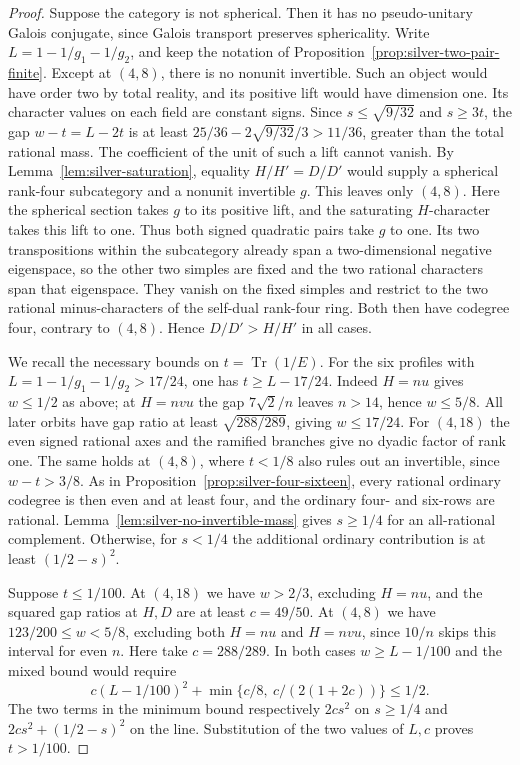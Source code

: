 \documentclass[11pt,reqno]{amsart}
\theoremstyle{remark}\newtheorem{remark}[theorem]{Remark}
\numberwithin{equation}{section}
\begin{document}
\begin{proof}
Suppose the category is not spherical. Then it has no pseudo-unitary
Galois conjugate, since Galois transport preserves sphericality.
Write $L=1-1/g_1-1/g_2$, and keep the notation of
Proposition~\ref{prop:silver-two-pair-finite}. Except at $(4,8)$, there is no nonunit
invertible. Such an object would have order two by total reality,
and its positive lift would have dimension one. Its character values
on each field are constant signs. Since $s\le\sqrt{9/32}$ and
$s\ge3t$, the gap $w-t=L-2t$ is at least
$25/36-2\sqrt{9/32}/3>11/36$, greater than the total rational mass.
The coefficient of the unit of such a lift cannot vanish.
By Lemma~\ref{lem:silver-saturation}, equality $H/H'=D/D'$ would
supply a spherical rank-four subcategory and a nonunit invertible
$g$. This leaves only $(4,8)$. Here the spherical section takes $g$
to its positive lift, and the saturating $H$-character takes this
lift to one. Thus both signed quadratic pairs take $g$ to one.
Its two transpositions within the subcategory already span a
two-dimensional negative eigenspace, so the other two simples
are fixed and the two rational characters span that eigenspace.
They vanish on the fixed simples and restrict to the two rational
minus-characters of the self-dual rank-four ring. Both then have
codegree four, contrary to $(4,8)$. Hence $D/D'>H/H'$ in all cases.

We recall the necessary bounds on $t=\operatorname{Tr}(1/E)$. For
the six profiles with $L=1-1/g_1-1/g_2>17/24$, one has
$t\ge L-17/24$. Indeed $H=nu$ gives $w\le1/2$ as above; at
$H=nvu$ the gap $7\sqrt2/n$ leaves $n>14$, hence $w\le5/8$.
All later orbits have gap ratio at least $\sqrt{288/289}$, giving
$w\le17/24$.
For $(4,18)$ the even signed rational axes and the ramified branches
give no dyadic factor of rank one. The same holds at $(4,8)$, where
$t<1/8$ also rules out an invertible, since $w-t>3/8$. As in
Proposition~\ref{prop:silver-four-sixteen}, every rational ordinary
codegree is then even and at least four, and the ordinary four- and
six-rows are rational. Lemma~\ref{lem:silver-no-invertible-mass}
gives $s\ge1/4$ for an all-rational complement. Otherwise, for $s<1/4$
the additional ordinary contribution is at least $(1/2-s)^2$.

Suppose $t\le1/100$. At $(4,18)$ we have $w>2/3$, excluding
$H=nu$, and the squared gap ratios at $H,D$ are at least $c=49/50$.
At $(4,8)$ we have $123/200\le w<5/8$, excluding both $H=nu$
and $H=nvu$, since $10/n$ skips this interval for even $n$.
Here take $c=288/289$. In both cases $w\ge L-1/100$ and the
mixed bound would require
\[
 c(L-1/100)^2+\min\{c/8,\ c/(2(1+2c))\}\le1/2 .
\]
The two terms in the minimum bound respectively $2cs^2$ on
$s\ge1/4$ and $2cs^2+(1/2-s)^2$ on the line. Substitution of
the two values of $L,c$ proves $t>1/100$.


\end{proof}
\end{document}
